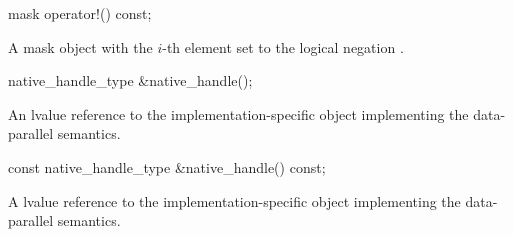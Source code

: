 \begin{itemdecl}
mask operator!() const;
\end{itemdecl}
\begin{itemdescr}
  \pnum\returns A mask object with the $i$-th element set to the logical negation \foralli.
\end{itemdescr}

\begin{itemdecl}
native_handle_type &native_handle();
\end{itemdecl}
\begin{itemdescr}
  \pnum\returns An lvalue reference to the implementation-specific object implementing the data-parallel semantics.
\end{itemdescr}

\begin{itemdecl}
const native_handle_type &native_handle() const;
\end{itemdecl}
\begin{itemdescr}
  \pnum\returns A \const lvalue reference to the implementation-specific object implementing the data-parallel semantics.
\end{itemdescr}


